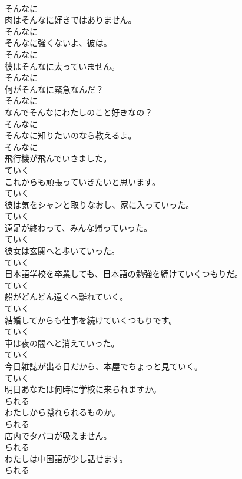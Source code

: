 \documentclass[8pt]{extreport}
\begin{document}
\begin{CJK}{UTF8}{min}
\\	そんなに
\\	肉はそんなに好きではありません。	
\\	そんなに
\\	そんなに強くないよ、彼は。	
\\	そんなに
\\	彼はそんなに太っていません。	
\\	そんなに
\\	何がそんなに緊急なんだ？	
\\	そんなに
\\	なんでそんなにわたしのこと好きなの？	
\\	そんなに
\\	そんなに知りたいのなら教えるよ。	
\\	そんなに
\\	飛行機が飛んでいきました。	
\\	ていく
\\	これからも頑張っていきたいと思います。	
\\	ていく
\\	彼は気をシャンと取りなおし、家に入っていった。	
\\	ていく
\\	遠足が終わって、みんな帰っていった。	
\\	ていく
\\	彼女は玄関へと歩いていった。	
\\	ていく
\\	日本語学校を卒業しても、日本語の勉強を続けていくつもりだ。	
\\	ていく
\\	船がどんどん遠くへ離れていく。	
\\	ていく
\\	結婚してからも仕事を続けていくつもりです。	
\\	ていく
\\	車は夜の闇へと消えていった。	
\\	ていく
\\	今日雑誌が出る日だから、本屋でちょっと見ていく。	
\\	ていく
\\	明日あなたは何時に学校に来られますか。	
\\	られる
\\	わたしから隠れられるものか。	
\\	られる
\\	店内でタバコが吸えません。	
\\	られる
\\	わたしは中国語が少し話せます。	
\\	られる

\end{CJK}
\end{document}
